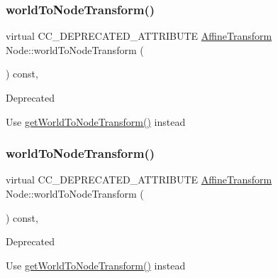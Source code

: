 \mbox{\label{classNode_a0b6b4ad592891ca7ec7ec0bd09341dd1}} 
\subsubsection{\texorpdfstring{world\+To\+Node\+Transform()}{worldToNodeTransform()}\hspace{0.1cm}{\footnotesize\ttfamily [1/2]}}
{\footnotesize\ttfamily virtual C\+C\+\_\+\+D\+E\+P\+R\+E\+C\+A\+T\+E\+D\+\_\+\+A\+T\+T\+R\+I\+B\+U\+TE \hyperlink{structAffineTransform}{Affine\+Transform} Node\+::world\+To\+Node\+Transform (\begin{DoxyParamCaption}{ }\end{DoxyParamCaption}) const\hspace{0.3cm}{\ttfamily [inline]}, {\ttfamily [virtual]}}

\begin{DoxyRefDesc}{Deprecated}
\item[\hyperlink{deprecated__deprecated000036}{Deprecated}]Use \hyperlink{classNode_ab41da5111de6d98710d0497e35063989}{get\+World\+To\+Node\+Transform()} instead \end{DoxyRefDesc}
\mbox{\label{classNode_a0b6b4ad592891ca7ec7ec0bd09341dd1}} 
\subsubsection{\texorpdfstring{world\+To\+Node\+Transform()}{worldToNodeTransform()}\hspace{0.1cm}{\footnotesize\ttfamily [2/2]}}
{\footnotesize\ttfamily virtual C\+C\+\_\+\+D\+E\+P\+R\+E\+C\+A\+T\+E\+D\+\_\+\+A\+T\+T\+R\+I\+B\+U\+TE \hyperlink{structAffineTransform}{Affine\+Transform} Node\+::world\+To\+Node\+Transform (\begin{DoxyParamCaption}{ }\end{DoxyParamCaption}) const\hspace{0.3cm}{\ttfamily [inline]}, {\ttfamily [virtual]}}

\begin{DoxyRefDesc}{Deprecated}
\item[\hyperlink{deprecated__deprecated000266}{Deprecated}]Use \hyperlink{classNode_ab41da5111de6d98710d0497e35063989}{get\+World\+To\+Node\+Transform()} instead \end{DoxyRefDesc}


